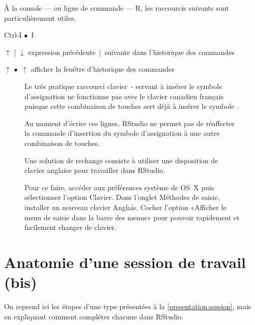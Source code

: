 À la console --- ou ligne de commande --- R, les raccourcis suivants
sont particulièrement utiles.
\begin{ttscript}{Ctrl-I $\bullet$ \cmdkey\,I}
  \raggedright
\item[$\uparrow$ | $\downarrow$] expression
  précédente~|~suivante dans l'historique des commandes
\item[\code{Ctrl+}$\uparrow$ $\bullet$ \cmdkey\,$\uparrow$] afficher
  la fenêtre d'historique des commandes
\end{ttscript}

\begin{figure}[t]
  \begin{osx}
    Le très pratique raccourci clavier {\optkey\,-} servant à insérer
    le symbole d'assignation ne fonctionne pas avec le clavier
    canadien français puisque cette combinaison de touches sert déjà à
    insérer le symbole \textbar.

    Au moment d'écrire ces lignes, RStudio ne permet pas de réaffecter
    la commande d'insertion du symbole d'assignation à une autre combinaison de touches.

    Une solution de rechange consiste à utiliser une disposition de
    clavier anglaise pour travailler dans RStudio.

    Pour ce faire, accéder aux préférences système de OS~X puis
    sélectionner l'option Clavier. Dans l'onglet Méthodes de saisie,
    installer un nouveau clavier Anglais. Cocher l'option «Afficher le
    menu de saisie dans la barre des menus» pour pouvoir rapidement et
    facilement changer de clavier.
  \end{osx}
  \label{fig:rstudio:assignation}
\end{figure}


\section{Anatomie d'une session de travail (bis)}
\label{rstudio:session}

On reprend ici les étapes d'une  type présentées à la \autoref{presentation:session}, mais
en expliquant comment compléter chacune dans RStudio.

